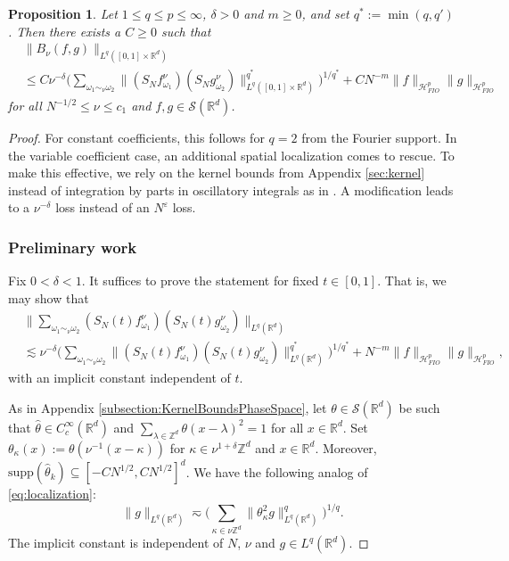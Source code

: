 \documentclass{amsart}
\numberwithin{equation}{section}
\newtheorem{proposition}[theorem]{Proposition}
\theoremstyle{definition}
\newcommand{\Rd}{\mathbb{R}^{d}}
\newcommand{\Z}{\mathbb{Z}}
\newcommand {\veps}{\varepsilon}
\newcommand {\ka}{\kappa}
\newcommand {\la}{\lambda}
\newcommand {\Sw}{\mathcal{S}}
\newcommand {\w}{\omega}
\begin{document}
\begin{proposition}
\label{prop:AlmostOrthogonalityPhaseSpace}
Let $1\leq q\leq p \leq\infty$, $\delta>0$ and $m\geq0$, %
and set $q^{*}:=\min(q,q')$. Then there exists a $C\geq0$ such that
\begin{align*}
&\|B_{\nu}(f,g)\|_{L^{q}([0,1]\times \Rd)}\\
&\leq C\nu^{-\delta}\Big(\sum_{\w_{1}\sim_{\nu}\w_{2}}\|(S_{N} f^{\nu}_{\w_{1}})(S_{N} g^{\nu}_{\w_{2}})\|_{L^{q}([0,1]\times\Rd)}^{q^{*}}\Big)^{1/q^{*}}
+CN^{-m}\|f\|_{\mathcal{H}^{p}_{FIO}} \|g\|_{{\mathcal{H}^p_{FIO}}}
\end{align*}
for all $N^{-1/2}\leq \nu\leq c_{1}$ and $f,g\in\Sw(\Rd)$. 
\end{proposition}
\begin{proof}
For constant coefficients, this follows for $q=2$ from the Fourier support. In the variable coefficient case, an additional spatial localization comes to rescue. To make this effective, we rely on the kernel bounds from Appendix \ref{sec:kernel} instead of integration by parts in oscillatory integrals as in \cite{Lee2006}. A modification leads to a $\nu^{-\delta}$ loss instead of an $N^{\veps}$ loss. 

\subsubsection*{Preliminary work}
Fix $0<\delta<1$. It suffices to prove the statement for fixed $t\in[0,1]$. That is, we may show that
\begin{align*}
&\Big\|\sum_{\w_{1}\sim_{\nu}\w_{2}}(S_{N}(t)f^{\nu}_{\w_{1}})( S_{N}(t)g^{\nu}_{\w_{2}})\Big\|_{L^{q}(\Rd)}\\
&\lesssim \nu^{-\delta}\Big(\sum_{\w_{1}\sim_{\nu}\w_{2}}\|(S_{N}(t) f^{\nu}_{\w_{1}})(S_{N}(t)g^{\nu}_{\w_{2}})\|_{L^{q}(\Rd)}^{q^{*}}\Big)^{1/q^{*}}
+N^{-m}\|f\|_{\mathcal{H}^{p}_{FIO}} \|g\|_{{\mathcal{H}^p_{FIO}}},
\end{align*}
with an implicit constant independent of $t$.

As in Appendix \ref{subsection:KernelBoundsPhaseSpace}, let $\theta \in \mathcal{S}(\Rd)$ be such that $\widehat{\theta}\in C^{\infty}_{c}(\Rd)$ and %
$\sum_{\la \in \Z^{d}} \theta(x-\la)^2 = 1$ for all $x \in \Rd$. Set 
$\theta_{\ka}(x):=\theta(\nu^{-1}(x-\ka))$ for $\ka\in \nu^{1+\delta} \Z^{d}$ and $x\in\Rd$. Moreover, $\text{supp}(\hat{\theta}_k) \subseteq [-C N^{1/2},CN^{1/2}]^d$. We have the following analog of \eqref{eq:localization}:
\begin{equation}\label{eq:localizationtwo}
\|g\|_{L^{q}(\Rd)}\eqsim \Big(\sum_{\kappa\in \nu\Z^{d}}\|\theta^2_{\kappa}g\|_{L^{q}(\Rd)}^{q}\Big)^{1/q}.
\end{equation}
The implicit constant is independent of $N$, $\nu$ and $g\in L^{q}(\Rd)$. 


\end{proof}
\end{document}
